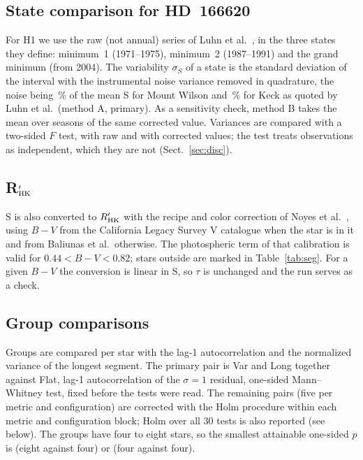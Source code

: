 \subsection{State comparison for HD~166620}

For H1 we use the raw (not annual) series of Luhn et al.\ \cite{luhn2022}, in the three states they define: minimum~1 (1971--1975), minimum~2 (1987--1991) and the grand minimum (from 2004). The variability $\sigma_S$ of a state is the standard deviation of the interval with the instrumental noise variance removed in quadrature, the noise being \NoiseMW\,\% of the mean S for Mount Wilson and \NoiseKeck\,\% for Keck as quoted by Luhn et al.\ (method A, primary). As a sensitivity check, method B takes the mean over seasons of the same corrected value. Variances are compared with a two-sided $F$ test, with raw and with corrected values; the test treats observations as independent, which they are not (Sect.~\ref{sec:disc}).

\subsection{R$'_{\rm HK}$}

S is also converted to $R'_{\rm HK}$ with the recipe and color correction of Noyes et al.\ \cite{noyes1984}, using $B\!-\!V$ from the California Legacy Survey V catalogue \cite{isaacson2024} when the star is in it and from Baliunas et al.\ otherwise. The photospheric term of that calibration is valid for $0.44 < B\!-\!V < 0.82$; stars outside are marked in Table~\ref{tab:seg}. For a given $B\!-\!V$ the conversion is linear in S, so $\tau$ is unchanged and the run serves as a check.

\subsection{Group comparisons}

Groups are compared per star with the lag-1 autocorrelation and the normalized variance of the longest segment. The primary pair is Var and Long together against Flat, lag-1 autocorrelation of the $\sigma = 1$ residual, one-sided Mann--Whitney test, fixed before the tests were read. The remaining pairs (five per metric and configuration) are corrected with the Holm procedure within each metric and configuration block; Holm over all 30 tests is also reported (see below). The groups have four to eight stars, so the smallest attainable one-sided $p$ is \MinPCycleFlat{} (eight against four) or \MinPFourFour{} (four against four).

